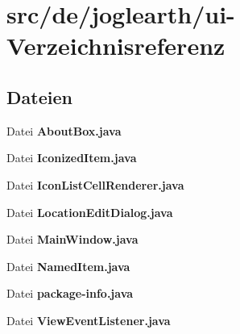 \section{src/de/joglearth/ui-\/\-Verzeichnisreferenz}
\label{dir_4b274c199fc58ae06d55f08d9b9a949d}
\subsection*{Dateien}
\begin{DoxyCompactItemize}
\item 
Datei {\bfseries About\-Box.\-java}
\item 
Datei {\bfseries Iconized\-Item.\-java}
\item 
Datei {\bfseries Icon\-List\-Cell\-Renderer.\-java}
\item 
Datei {\bfseries Location\-Edit\-Dialog.\-java}
\item 
Datei {\bfseries Main\-Window.\-java}
\item 
Datei {\bfseries Named\-Item.\-java}
\item 
Datei {\bfseries package-\/info.\-java}
\item 
Datei {\bfseries View\-Event\-Listener.\-java}
\end{DoxyCompactItemize}

